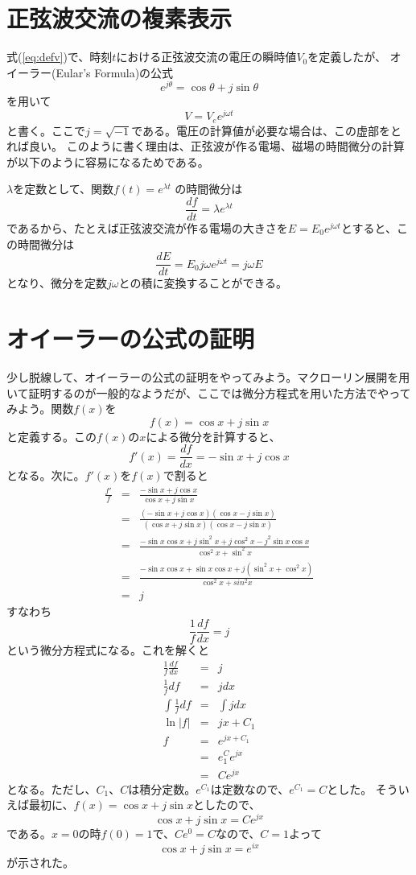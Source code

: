 \section*{正弦波交流の複素表示}
式(\ref{eq:defv})で、時刻$t$における正弦波交流の電圧の瞬時値$V_0$を定義したが、
オイーラー(Eular's Formula)の公式
\[
e^{j\theta} = \cos\theta + j\sin\theta
\]
を用いて
\begin{equation}
V = V_e e^{j\omega t} \label{eq:sinwave}
\end{equation}
と書く。ここで$j=\sqrt{-1}$である。電圧の計算値が必要な場合は、この虚部をとれば良い。
このように書く理由は、正弦波が作る電場、磁場の時間微分の計算が以下のように容易になるためである。

$\lambda$を定数として、関数$f(t)=e^{\lambda t}$
の時間微分は
\[
\frac{df}{dt}=\lambda e^{\lambda t}
\]
であるから、たとえば正弦波交流が作る電場の大きさを$E=E_0e^{j\omega t}$とすると、この時間微分は
\[
\frac{dE}{dt} = E_0 j\omega e^{j \omega t} = j\omega E
\]
となり、微分を定数$j\omega$との積に変換することができる。


\section*{オイーラーの公式の証明}
少し脱線して、オイーラーの公式の証明をやってみよう。マクローリン展開を用いて証明するのが一般的なようだが、ここでは微分方程式を用いた方法でやってみよう。関数$f(x)$を
\[
f(x) = \cos x + j\sin x
\]
と定義する。この$f(x)$の$x$による微分を計算すると、
\[
f'(x) = \frac{df}{dx} = -\sin x + j\cos x
\]
となる。次に。$f'(x)$を$f(x)$で割ると
\begin{eqnarray*}
\frac{f'}{f} &=& \frac{-\sin x + j\cos x}{\cos x + j\sin x}\\
&=&\frac{(-\sin x + j\cos x)(\cos x - j\sin x)}{(\cos x + j\sin x)(\cos x - j\sin x)}\\
&=&\frac{-\sin x \cos x + j\sin^2 x + j\cos^2 x -j^2\sin x \cos x}{\cos^2 x + \sin^2 x}\\
&=&\frac{-\sin x \cos x + \sin x \cos x +j(\sin^2 x + \cos^2 x)}{\cos^2x + sin^2x}\\
&=&j
\end{eqnarray*}
すなわち
\[
\frac{1}{f}\frac{df}{dx} = j
\]
という微分方程式になる。これを解くと
\begin{eqnarray*}
\frac{1}{f}\frac{df}{dx} &=& j\\
\frac{1}{f}df &=& jdx\\
\int \frac{1}{f} df &=& \int j dx\\
\ln|f| &=& jx + C_1\\
f &=& e^{jx+C_1}\\
  &=& e^C_1e^{jx}\\
 &=& C e^{jx}
\end{eqnarray*}
となる。ただし、$C_1$、$C$は積分定数。$e^{C_1}$は定数なので、$e^{C_1}=C$とした。
そういえば最初に、$f(x)=\cos x + j\sin x$としたので、
\[
\cos x + j\sin x = C e^{jx}
\]
である。$x=0$の時$f(0) = 1$で、$C e^{0} = C$なので、$C=1$よって
\[
\cos x + j\sin x = e^{ix}
\]
が示された。

